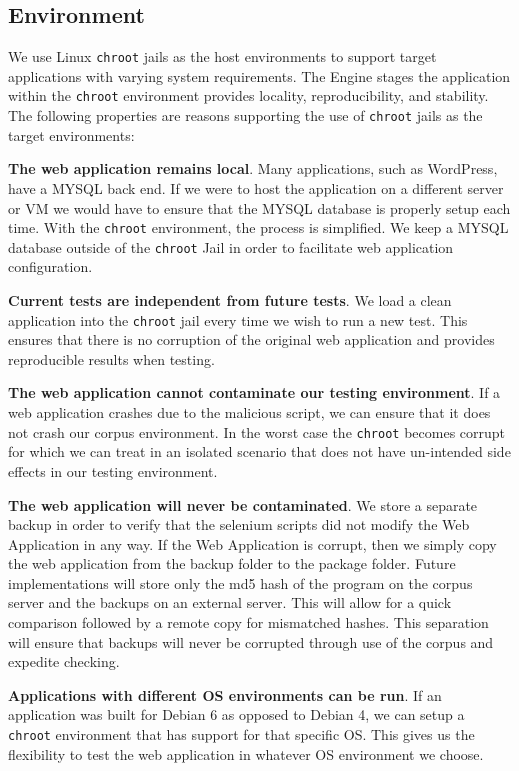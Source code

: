 \documentclass[letterpaper,twocolumn,10pt]{article}
\begin{document}
\subsection{Environment}

We use Linux {\tt chroot} jails as the host environments to support target applications with varying system requirements.  The Engine stages the application within the {\tt chroot} environment provides locality, reproducibility, and stability. The following properties are reasons supporting the use of {\tt chroot} jails as the target environments:\par
{\bf The web application remains local}.  Many applications, such as WordPress, have a MYSQL back end.  If we were to host the application on a different server or VM we would have to ensure that the MYSQL database is properly setup each time.  With the {\tt chroot} environment, the process is simplified. We keep a MYSQL database outside of the {\tt chroot} Jail in order to facilitate web application configuration. \par
{\bf Current tests are independent from future tests}.  We load a clean application into the {\tt chroot} jail every time we wish to run a new test.  This ensures that there is no corruption of the original web application and provides reproducible results when testing.\par
{\bf The web application cannot contaminate our testing environment}.  If a web application crashes due to the malicious script, we can ensure that it does not crash our corpus environment.  In the worst case the {\tt chroot} becomes corrupt for which we can treat in an isolated scenario that does not have un-intended side effects in our testing environment.\par
{\bf The web application will never be contaminated}.  We store a separate backup in order to verify that the selenium scripts did not modify the Web Application in any way.  If the Web Application is corrupt, then we simply copy the web application from the backup folder to the package folder.  Future implementations will store only the md5 hash of the program on the corpus server and the backups on an external server.  This will allow for a quick comparison followed by a remote copy for mismatched hashes.  This separation will ensure that backups will never be corrupted through use of the corpus and expedite checking.\par
{\bf Applications with different OS environments can be run}.  If an application was built for Debian 6 as opposed to Debian 4, we can setup a {\tt chroot} environment that has support for that specific OS.  This gives us the flexibility to test the web application in whatever OS environment we choose.\par
\end{document}
